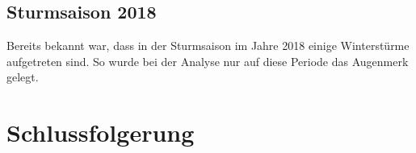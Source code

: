\begin{refsection}
\subsection{Sturmsaison 2018}
Bereits bekannt war, dass in der Sturmsaison im Jahre 2018 einige Winterstürme aufgetreten sind. So wurde bei der Analyse nur auf diese Periode das Augenmerk gelegt.





\section{Schlussfolgerung}

\printbibliography[heading=subbibliography]
\end{refsection}
